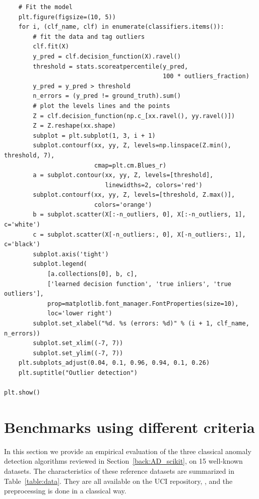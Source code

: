 \begin{mdframed}[hidealllines=true, backgroundcolor=lightgray]
\begin{verbatim}
    # Fit the model
    plt.figure(figsize=(10, 5))
    for i, (clf_name, clf) in enumerate(classifiers.items()):
        # fit the data and tag outliers
        clf.fit(X)
        y_pred = clf.decision_function(X).ravel()
        threshold = stats.scoreatpercentile(y_pred,
                                            100 * outliers_fraction)
        y_pred = y_pred > threshold
        n_errors = (y_pred != ground_truth).sum()
        # plot the levels lines and the points
        Z = clf.decision_function(np.c_[xx.ravel(), yy.ravel()])
        Z = Z.reshape(xx.shape)
        subplot = plt.subplot(1, 3, i + 1)
        subplot.contourf(xx, yy, Z, levels=np.linspace(Z.min(), threshold, 7),
                         cmap=plt.cm.Blues_r)
        a = subplot.contour(xx, yy, Z, levels=[threshold],
                            linewidths=2, colors='red')
        subplot.contourf(xx, yy, Z, levels=[threshold, Z.max()],
                         colors='orange')
        b = subplot.scatter(X[:-n_outliers, 0], X[:-n_outliers, 1], c='white')
        c = subplot.scatter(X[-n_outliers:, 0], X[-n_outliers:, 1], c='black')
        subplot.axis('tight')
        subplot.legend(
            [a.collections[0], b, c],
            ['learned decision function', 'true inliers', 'true outliers'],
            prop=matplotlib.font_manager.FontProperties(size=10),
            loc='lower right')
        subplot.set_xlabel("%d. %s (errors: %d)" % (i + 1, clf_name, n_errors))
        subplot.set_xlim((-7, 7))
        subplot.set_ylim((-7, 7))
    plt.subplots_adjust(0.04, 0.1, 0.96, 0.94, 0.1, 0.26)
    plt.suptitle("Outlier detection")

plt.show()
\end{verbatim}
\end{mdframed}


\section{Benchmarks using different criteria}
\label{aistat:sec:benchmark}

In this section we provide an empirical evaluation of the three classical anomaly detection algorithms reviewed in Section~\ref{back:AD_scikit}, on 15 well-known datasets.
The characteristics of these reference datasets are summarized in Table~\ref{table:data}. They are all available on the UCI repository, \cite{Lichman2013}, and the preprocessing is done in a classical way. %
%

